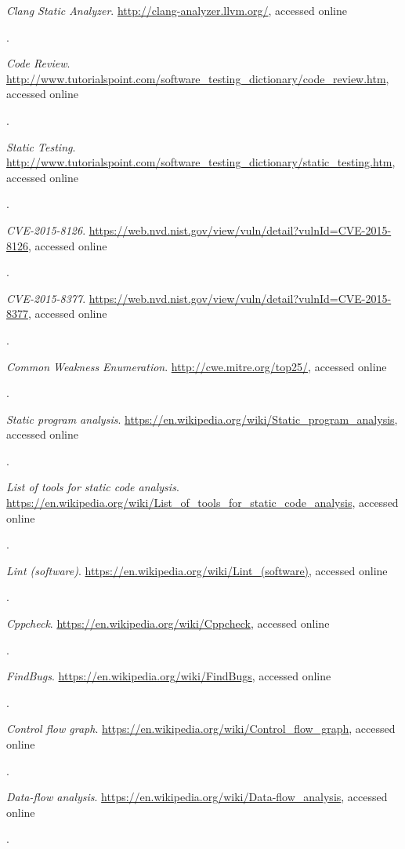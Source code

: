 \documentclass[12pt]{extarticle}
\begin{document}
\begin{thebibliography}{9}
	\textit{Clang Static Analyzer}.
	\url{http://clang-analyzer.llvm.org/}, accessed online 
	\date{17 April 2016}.

	\textit{Code Review}.
	\url{http://www.tutorialspoint.com/software_testing_dictionary/code_review.htm}, accessed online 
	\date{17 April 2016}.

	\textit{Static Testing}.
	\url{http://www.tutorialspoint.com/software\_testing\_dictionary/static\_testing.htm}, accessed online 
	\date{17 April 2016}.


	\textit{CVE-2015-8126}.
	\url{https://web.nvd.nist.gov/view/vuln/detail?vulnId=CVE-2015-8126}, accessed online 
	\date{17 April 2016}.


	\textit{CVE-2015-8377}.
	\url{https://web.nvd.nist.gov/view/vuln/detail?vulnId=CVE-2015-8377}, accessed online 
	\date{17 April 2016}.


	\textit{Common Weakness Enumeration}.
	\url{http://cwe.mitre.org/top25/}, accessed online 
	\date{17 April 2016}.


	
	\textit{Static program analysis}.
	\url{https://en.wikipedia.org/wiki/Static_program_analysis}, accessed online
	\date{11 April 2016}.
	
	\textit{List of tools for static code analysis}.
	\url{https://en.wikipedia.org/wiki/List_of_tools_for_static_code_analysis}, accessed online
	\date{17 April 2016}.
	
	\textit{Lint (software)}.
	\url{https://en.wikipedia.org/wiki/Lint_(software)}, accessed online
	\date{17 April 2016}.
	
	\textit{Cppcheck}.
	\url{https://en.wikipedia.org/wiki/Cppcheck}, accessed online
	\date{17 April 2016}.

	\textit{FindBugs}.
	\url{https://en.wikipedia.org/wiki/FindBugs}, accessed online
	\date{17 April 2016}.


	\textit{Control flow graph}.
	\url{https://en.wikipedia.org/wiki/Control_flow_graph}, accessed online
	\date{17 April 2016}.

	\textit{Data-flow analysis}.
	\url{https://en.wikipedia.org/wiki/Data-flow_analysis}, accessed online
	\date{17 April 2016}.


\end{thebibliography}
\end{document}
